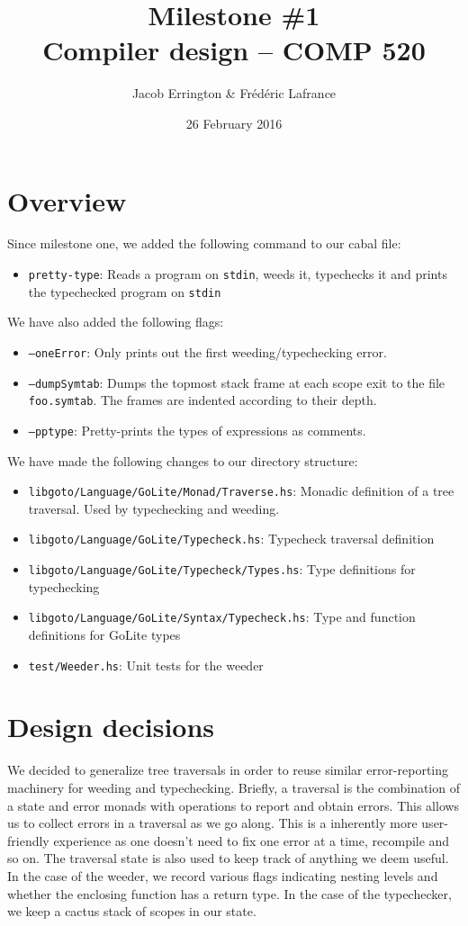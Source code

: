 \documentclass[letterpaper,11pt]{article}
\title{Milestone \#1\\Compiler design -- COMP 520}
\author{Jacob Errington \& Fr\'ed\'eric Lafrance}
\date{26 February 2016}
\begin{document}
\maketitle

\section{Overview}
Since milestone one, we added the following command to our cabal file:
\begin{itemize}
\item\texttt{pretty-type}: Reads a program on \texttt{stdin}, weeds it, typechecks it and prints the typechecked program on \texttt{stdin}
\end{itemize}

We have also added the following flags:
\begin{itemize}
\item\texttt{--oneError}: Only prints out the first weeding/typechecking error.
\item\texttt{--dumpSymtab}: Dumps the topmost stack frame at each scope exit to the file \texttt{foo.symtab}. The frames are indented according to their depth.
\item\texttt{--pptype}: Pretty-prints the types of expressions as comments.
\end{itemize}

We have made the following changes to our directory structure:
\begin{itemize}
\item \texttt{libgoto/Language/GoLite/Monad/Traverse.hs}: Monadic definition of a tree traversal. Used by typechecking and weeding.
\item \texttt{libgoto/Language/GoLite/Typecheck.hs}: Typecheck traversal definition
\item \texttt{libgoto/Language/GoLite/Typecheck/Types.hs}: Type definitions for typechecking
\item \texttt{libgoto/Language/GoLite/Syntax/Typecheck.hs}: Type and function definitions for GoLite types
\item \texttt{test/Weeder.hs}: Unit tests for the weeder
\end{itemize}

\section{Design decisions}
We decided to generalize tree traversals in order to reuse similar error-reporting machinery for weeding and typechecking. Briefly, a traversal is the combination of a state and error monads with operations to report and obtain errors. This allows us to collect errors in a traversal as we go along. This is a inherently more user-friendly experience as one doesn't need to fix one error at a time, recompile and so on. The traversal state is also used to keep track of anything we deem useful. In the case of the weeder, we record various flags indicating nesting levels and whether the enclosing function has a return type. In the case of the typechecker, we keep a cactus stack of scopes in our state.
\end{document}
